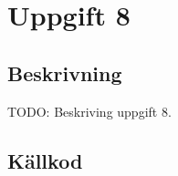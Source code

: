 \section{Uppgift 8}\label{uppgift-8}

\subsection{Beskrivning}
TODO: Beskriving uppgift 8.

\subsection{Källkod}\label{uppgift-8_src}
\inputminted[]{java}{../src/Lab1Uppg08.java}
